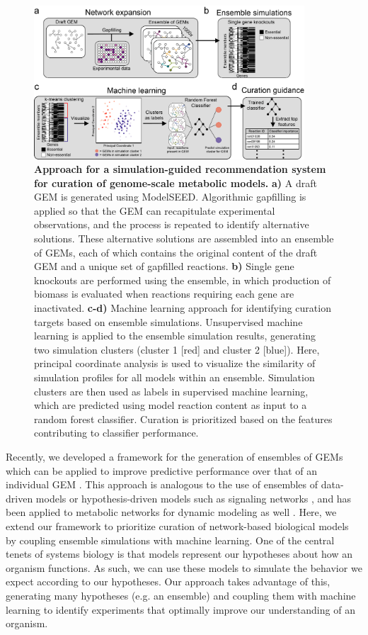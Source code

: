 \documentclass[11pt,twocolumn,notitlepage,openany,twoside]{book}
\begin{document}
\begin{refsection}
\begin{figure}[tb]
\centering
\includegraphics[width=0.9\textwidth]{ch3_fig1}
\caption[ Approach for a simulation-guided recommendation system for curation of genome-scale metabolic models.]{\textbf{ Approach for a simulation-guided recommendation system for curation of genome-scale metabolic models.} \textbf{a)} A draft GEM is generated using ModelSEED. Algorithmic gapfilling is applied so that the GEM can recapitulate experimental observations, and the process is repeated to identify alternative solutions. These alternative solutions are assembled into an ensemble of GEMs, each of which contains the original content of the draft GEM and a unique set of gapfilled reactions. \textbf{b)} Single gene knockouts are performed using the ensemble, in which production of biomass is evaluated when reactions requiring each gene are inactivated. \textbf{c-d)} Machine learning approach for identifying curation targets based on ensemble simulations. Unsupervised machine learning is applied to the ensemble simulation results, generating two simulation clusters (cluster 1 [red] and cluster 2 [blue]). Here, principal coordinate analysis is used to visualize the similarity of simulation profiles for all models within an ensemble. Simulation clusters are then used as labels in supervised machine learning, which are predicted using model reaction content as input to a random forest classifier. Curation is prioritized based on the features contributing to classifier performance.}
\end{figure}

Recently, we developed a framework for the generation of ensembles of GEMs which can be applied to improve predictive performance over that of an individual GEM \cite{Biggs2017-md}. This approach is analogous to the use of ensembles of data-driven models \cite{Dietterich2000-dq} or hypothesis-driven models such as signaling networks \cite{Kuepfer2007-gq}, and has been applied to metabolic networks for dynamic modeling as well \cite{Tran2008-pt}. Here, we extend our framework to prioritize curation of network-based biological models by coupling ensemble simulations with machine learning. One of the central tenets of systems biology is that models represent our hypotheses about how an organism functions. As such, we can use these models to simulate the behavior we expect according to our hypotheses. Our approach takes advantage of this, generating many hypotheses (e.g. an ensemble) and coupling them with machine learning to identify experiments that optimally improve our understanding of an organism.


\end{refsection}
\end{document}
